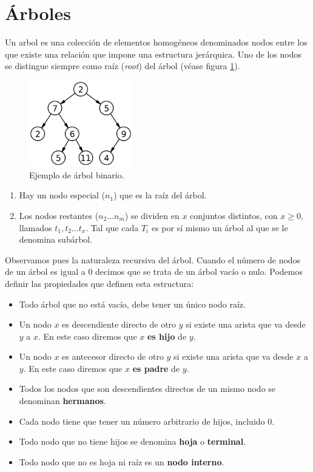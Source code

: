 \documentclass[a4paper, 11pt, titlepage]{article}
\begin{document}
\section{Árboles}

    Un arbol es una colección de elementos homogéneos denominados nodos entre los que 
    existe una relación que impone una estructura jerárquica. Uno de los nodos se distingue
    siempre como raíz (\textit{root}) del árbol (véase figura \ref{arbol01}).

    \begin{figure}[htp]
        \centering
        \includegraphics[width=0.4\textwidth]{resources/arbol01.png}
        \caption{Ejemplo de árbol binario.}
        \label{arbol01}
    \end{figure}

    \begin{enumerate}
        \item Hay un nodo especial ($n_1$) que es la raíz del árbol.
        \item Los nodos restantes ($n_2 ... n_m$) se dividen en $x$ conjuntos distintos, 
        con $x\geq 0$, llamados $t_1, t_2 ... t_x$. Tal que cada $T_i$ es por sí mismo un 
        árbol al que se le denomina subárbol. 
    \end{enumerate}

    Observamos pues la naturaleza recursiva del árbol. Cuando el número de nodos de un árbol
    es igual a 0 decimos que se trata de un árbol vacío o nulo. Podemos definir las propiedades 
    que definen esta estructura:

    \begin{itemize}
        \item Todo árbol que no está vacío, debe tener un único nodo raíz.
        \item Un nodo $x$ es descendiente directo de otro $y$ si existe una arista que va 
        desde $y$ a $x$. En este caso diremos que $x$ \textbf{es hijo} de $y$.
        \item Un nodo $x$ es antecesor directo de otro $y$ si existe una arista que va desde
        $x$ a $y$. En este caso diremos que $x$ \textbf{es padre} de $y$.
        \item Todos los nodos que son descendientes directos de un mismo nodo se denominan 
        \textbf{hermanos}.
        \item Cada nodo tiene que tener un número arbitrario de hijos, incluido 0.
        \item Todo nodo que no tiene hijos se denomina \textbf{hoja} o \textbf{terminal}.
        \item Todo nodo que no es hoja ni raíz es un \textbf{nodo interno}.
    \end{itemize}
\end{document}
